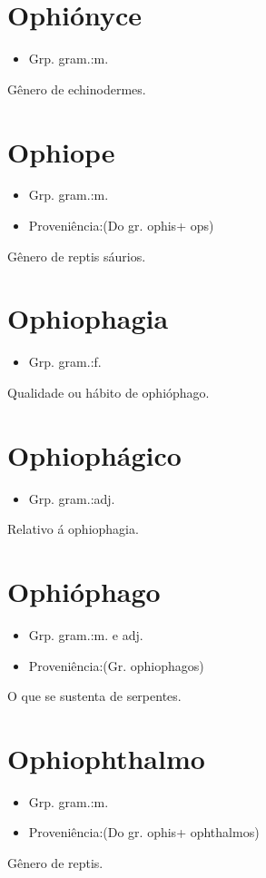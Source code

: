 \section{Ophiónyce}
\begin{itemize}
\item {Grp. gram.:m.}
\end{itemize}
Gênero de echinodermes.
\section{Ophiope}
\begin{itemize}
\item {Grp. gram.:m.}
\end{itemize}
\begin{itemize}
\item {Proveniência:(Do gr. \textunderscore ophis\textunderscore  + \textunderscore ops\textunderscore )}
\end{itemize}
Gênero de reptis sáurios.
\section{Ophiophagia}
\begin{itemize}
\item {Grp. gram.:f.}
\end{itemize}
Qualidade ou hábito de ophióphago.
\section{Ophiophágico}
\begin{itemize}
\item {Grp. gram.:adj.}
\end{itemize}
Relativo á ophiophagia.
\section{Ophióphago}
\begin{itemize}
\item {Grp. gram.:m.  e  adj.}
\end{itemize}
\begin{itemize}
\item {Proveniência:(Gr. \textunderscore ophiophagos\textunderscore )}
\end{itemize}
O que se sustenta de serpentes.
\section{Ophiophthalmo}
\begin{itemize}
\item {Grp. gram.:m.}
\end{itemize}
\begin{itemize}
\item {Proveniência:(Do gr. \textunderscore ophis\textunderscore  + \textunderscore ophthalmos\textunderscore )}
\end{itemize}
Gênero de reptis.
